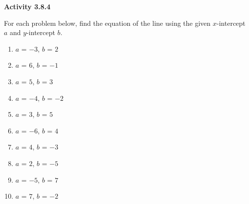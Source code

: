 \vspace{1ex}
\noindent\textbf{Activity 3.8.4}

\vspace{0.75ex}

For each problem below, find the equation of the line using the given $x$-intercept $a$ and $y$-intercept $ b $.
\begin{multicols}{2}
\begin{enumerate}[noitemsep, label = \color{blue}\arabic*. ]
    \item $ a $ = $-3$, $ b $ = $2$
    \item $ a $ = $6$, $ b $ = $-1$
    \item $ a $ = $5$, $ b $ = $3$
    \item $ a $ = $-4$, $ b $ = $-2$
    \item $ a $ = $3$, $ b $ = $5$
    \item $ a $ = $-6$, $ b $ = $4$
    \item $ a $ = $4$, $ b $ = $-3$
    \item $ a $ = $2$, $ b $ = $-5$
    \item $ a $ = $-5$, $ b $ = $7$
    \item $ a $ = $7$, $ b $ = $-2$
\end{enumerate}
\end{multicols}


